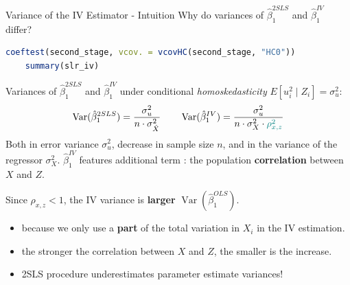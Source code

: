 \documentclass[9pt,aspectratio=169, xcolor=dvipsnames]{beamer}
\begin{document}
\begin{frame}[fragile]{Variance of the IV Estimator - Intuition}
\linespread{1.3}\selectfont %
Why do variances of $\hat\beta_1^{2SLS}$ and $\hat\beta_1^{IV}$ differ?
\begin{lstlisting}[language=R]
    coeftest(second_stage, vcov. = vcovHC(second_stage, "HC0")) 
    summary(slr_iv)
\end{lstlisting}
\pause
Variances of $\hat\beta_1^{2SLS}$ and $\hat\beta_1^{IV}$ 
under conditional \emph{homoskedasticity} $E[u_i^2 \mid Z_i] = \sigma_u^2$:
\vspace{-1.5mm}
\[
\operatorname{Var}(\hat\beta_1^{2SLS}) 
    = \frac{\sigma_u^2}{n \cdot \sigma_{\hat X}^2}
\qquad
\operatorname{Var}(\hat\beta_1^{IV}) 
    = \frac{\sigma_u^2}{n \cdot \sigma_X^2 \cdot \textcolor{teal}{\rho_{x,z}^2}}
\]
Both in error variance $\sigma_u^2$,
decrease in sample size $n$, and in the variance of the regressor $\sigma_X^2$. 
\pause $\hat\beta_1^{IV}$ features additional term \color{black}: the population \textbf{correlation} between $X$ and $Z$.

Since $\rho_{x,z} < 1$, the IV variance is \textbf{\alert{larger}}
$\operatorname{Var}(\hat\beta_1^{OLS})$.

\begin{itemize}
    \item because we only use a \textbf{part} of the total variation in $X_i$ in the IV estimation.
    \item the stronger the correlation between $X$ and $Z$, the smaller is the increase.
    \item[$\rightarrow$] 2SLS procedure underestimates parameter estimate variances!
\end{itemize}

\end{frame}
\end{document}
